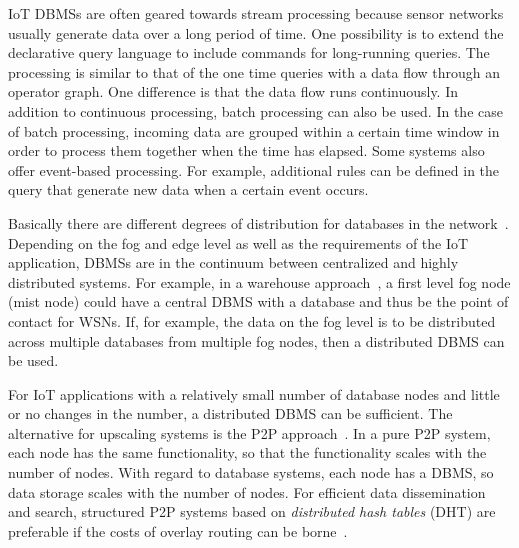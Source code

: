 \documentclass[english,version-2019-11]{uzl-thesis}
\begin{document}
IoT DBMSs are often geared towards stream processing because sensor networks usually generate data over a long period of time. One possibility is to extend the declarative query language to include commands for long-running queries. The processing is similar to that of the one time queries with a data flow through an operator graph. One difference is that the data flow runs continuously. In addition to continuous processing, batch processing can also be used. In the case of batch processing, incoming data are grouped within a certain time window in order to process them together when the time has elapsed. Some systems also offer event-based processing. For example, additional rules can be defined in the query that generate new data when a certain event occurs.~\cite{StreamDBSSurvey}

Basically there are different degrees of distribution for databases in the network~\cite{DistributedDBS}. Depending on the fog and edge level as well as the requirements of the IoT application, DBMSs are in the continuum between centralized and highly distributed systems. For example, in a warehouse approach~\cite{WSNDatabases}, a first level fog node (mist node) could have a central DBMS with a database and thus be the point of contact for WSNs. If, for example, the data on the fog level is to be distributed across multiple databases from multiple fog nodes, then a distributed DBMS can be used.

For IoT applications with a relatively small number of database nodes and little or no changes in the number, a distributed DBMS can be sufficient. The alternative for upscaling systems is the P2P approach~\cite{DistributedDBS}. In a pure P2P system, each node has the same functionality, so that the functionality scales with the number of nodes. With regard to database systems, each node has a DBMS, so data storage scales with the number of nodes. For efficient data dissemination and search, structured P2P systems based on \emph{distributed hash tables} (DHT) are preferable if the costs of overlay routing can be borne~\cite{TinyTurrent}.
\end{document}
